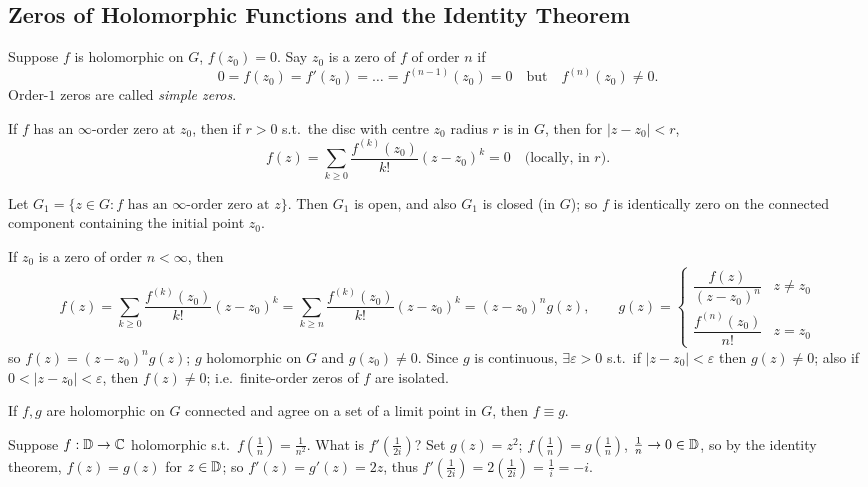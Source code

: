 \documentclass[11pt]{article}
\begin{document}
\subsection{Zeros of Holomorphic Functions and the Identity Theorem}

\begin{definition}
Suppose $f$ is holomorphic on $G$, $f(z_0)=0$. Say $z_0$ is a zero of $f$ of order $n$ if
\[
0 = f(z_0) = f'(z_0) = \dots = f^{(n-1)}(z_0) = 0 \quad\text{but}\quad f^{(n)}(z_0) \ne 0.
\]
Order-$1$ zeros are called \emph{simple zeros}.
\end{definition}

\begin{example}
If $f$ has an $\infty$-order zero at $z_0$, then if $r>0$ s.t.\ the disc with centre $z_0$ radius $r$ is in $G$, then for $|z-z_0|<r$,
\[
f(z) = \sum_{k\ge0} \frac{f^{(k)}(z_0)}{k!}(z-z_0)^k = 0 \quad \text{(locally, in $r$)}.
\]
\end{example}

Let $G_1 = \{z\in G : f \text{ has an } \infty\text{-order zero at } z\}$. Then $G_1$ is open, and also $G_1$ is closed (in $G$); so $f$ is identically zero on the connected component containing the initial point $z_0$.

If $z_0$ is a zero of order $n<\infty$, then
\[
f(z) = \sum_{k\ge0} \frac{f^{(k)}(z_0)}{k!}(z-z_0)^k = \sum_{k\ge n}\frac{f^{(k)}(z_0)}{k!}(z-z_0)^k = (z-z_0)^ng(z), \qquad g(z) = \begin{cases} \dfrac{f(z)}{(z-z_0)^n} & z\ne z_0 \\ \dfrac{f^{(n)}(z_0)}{n!} & z=z_0 \end{cases}
\]
so $f(z) = (z-z_0)^ng(z)$; $g$ holomorphic on $G$ and $g(z_0)\ne0$. Since $g$ is continuous, $\exists \varepsilon>0$ s.t.\ if $|z-z_0|<\varepsilon$ then $g(z)\ne0$; also if $0<|z-z_0|<\varepsilon$, then $f(z)\ne0$; i.e.\ finite-order zeros of $f$ are isolated.

\begin{theorem}
If $f, g$ are holomorphic on $G$ connected and agree on a set of a limit point in $G$, then $f\equiv g$.
\end{theorem}

\begin{example}
Suppose $f:{\mathbb{D}}\to{\mathbb{C}}$ holomorphic s.t.\ $f\left(\frac1n\right)=\frac{1}{n^2}$. What is $f'\left(\frac{1}{2i}\right)$? Set $g(z)=z^2$; $f\left(\frac1n\right)=g\left(\frac1n\right)$, $\frac1n\to0\in{\mathbb{D}}$, so by the identity theorem, $f(z)=g(z)$ for $z\in{\mathbb{D}}$; so $f'(z)=g'(z)=2z$, thus $f'\left(\frac{1}{2i}\right) = 2\left(\frac{1}{2i}\right) = \frac{1}{i} = -i$.
\end{example}
\end{document}
